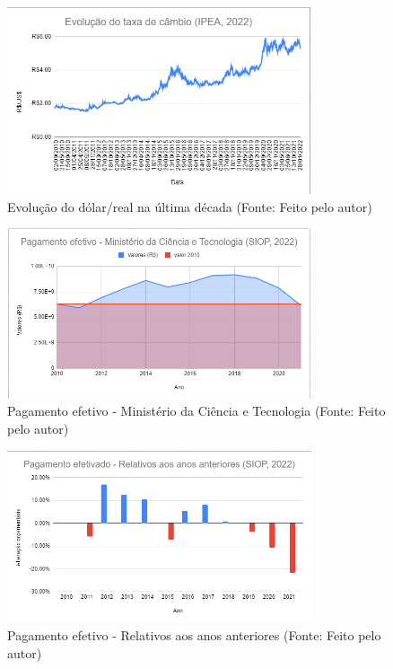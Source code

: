 \begin{figure}[!h]
    \centering
    \includegraphics[width=0.8\textwidth]{04-figuras/dolar.png}
    \caption{Evolução do dólar/real na última década (Fonte: Feito pelo autor)}
    \label{fig:dolar}
\end{figure}
\begin{figure}[!h]
    \centering
    \includegraphics[width=0.8\textwidth]{04-figuras/compartive.png}
    \caption{Pagamento efetivo - Ministério da Ciência e Tecnologia (Fonte: Feito pelo autor)}
    \label{fig:quedaorca}
\end{figure}
\begin{figure}[!h]
    \centering
    \includegraphics[width=0.8\textwidth]{04-figuras/compartive_last .png}
    \caption{Pagamento efetivo - Relativos aos anos anteriores (Fonte: Feito pelo autor)}
    \label{fig:quedaorca}
\end{figure}

